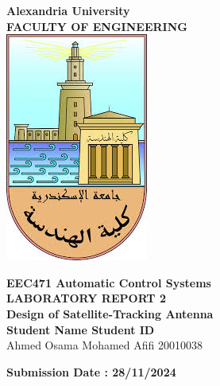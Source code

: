 \documentclass[a4paper, 12pt, english]{article}
\begin{document}
\begin{titlepage}
\begin{center}
\textbf{\LARGE Alexandria University}\\[0.5cm] 
\textbf{\large FACULTY OF ENGINEERING}\\[0.2cm]
\vspace{20pt}
\includegraphics{logo.png}\\[1cm]
\par
\vspace{20pt}
\textbf{\Large EEC471 Automatic Control Systems}\\
\vspace{15pt}
\myrule[1pt][7pt]
\textbf{\LARGE  LABORATORY REPORT 2}\\
\vspace{15pt}
\textbf{\large Design of Satellite-Tracking Antenna}\\
\myrule[1pt][7pt]
\vspace{25pt}
\textbf{\large \hspace{50pt}Student Name \hspace{60pt} Student ID}\\
Ahmed Osama Mohamed Afifi \hspace{60pt} 20010038 \\

\vspace{45pt}
\end{center}

\par
\vfill
\begin{center}
\textbf{Submission Date : 28/11/2024}\\
\end{center}

\end{titlepage}
\end{document}
